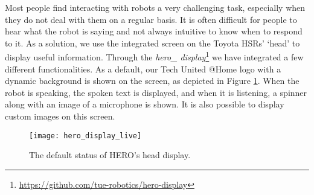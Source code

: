 \label{ssec:display}
Most people find interacting with robots a very challenging task, especially when they do not deal with them on a regular basis.
It is often difficult for people to hear what the robot is saying and not always intuitive to know when to respond to it. As a solution, we use the integrated screen on the Toyota HSRs' `head' to display useful information. Through the \emph{hero\_ display}\footnote{\url{https://github.com/tue-robotics/hero-display}} we have integrated a few different functionalities. As a default, our Tech United @Home logo with a dynamic background is shown on the screen, as depicted in Figure \ref{fig:hero_display}. When the robot is speaking, the spoken text is displayed, and when it is listening, a spinner along with an image of a microphone is shown. It is also possible to display custom images on this screen.
\begin{figure}[H]
    \centering
	\texttt{[image: hero\_display\_live]}
	\caption{
		The default status of HERO's head display.}
	\label{fig:hero_display}
\end{figure}